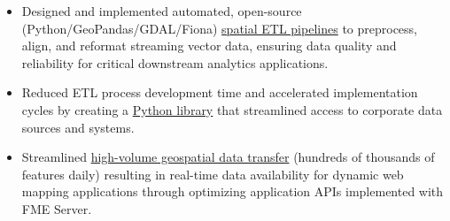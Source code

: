 \documentclass[letterpaper]{article}
\newenvironment{jobtasklist}
        {
            \vspace{-12pt}
            \begin{itemize} \itemsep 0pt
        }{
            \end{itemize}
            \vspace{-3pt}
        }
\newcommand{\impt}[1]{\uline{#1}}
\begin{document}
\begin{jobtasklist}
    \item Designed and implemented automated, open-source
        (Python/GeoPandas/GDAL/Fiona) \impt{spatial ETL pipelines}
            to preprocess, align, and reformat streaming vector data,
            ensuring data quality and reliability for critical downstream analytics applications.
    \item Reduced ETL process development time and accelerated implementation cycles by
            creating a \impt{Python library} that streamlined access to corporate data sources and systems.
    \item Streamlined \impt{high-volume geospatial data transfer} (hundreds of thousands of features daily)
            resulting in real-time data availability for dynamic web mapping applications
            through optimizing application APIs implemented with FME Server.

\end{jobtasklist}
\end{document}
